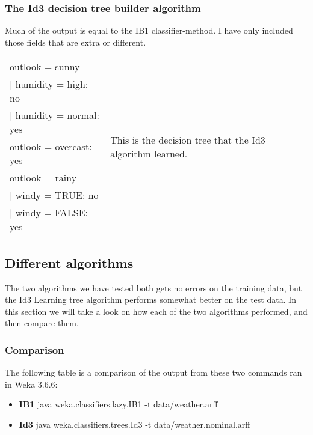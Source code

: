 \documentclass[english,a4paper]{article}
\begin{document}
\subsubsection{The Id3 decision tree builder algorithm}
Much of the output is equal to the IB1 classifier-method. I have only included
those fields that are extra or different.\\
\begin{tabular}{|l|l|}
\hline
outlook = sunny&\multirow{7}{210pt}{
This is the decision tree that the Id3 algorithm learned.
}\\
|  humidity = high: no&\\
|  humidity = normal: yes&\\
outlook = overcast: yes&\\
outlook = rainy&\\
|  windy = TRUE: no&\\
|  windy = FALSE: yes&\\
\hline
\end{tabular}

\subsection{Different algorithms}
The two algorithms we have tested both gets no errors on the training data, but
the Id3 Learning tree algorithm performs somewhat better on the test data. In
this section we will take a look on how each of the two algorithms performed,
and then compare them.

\subsubsection{Comparison}
The following table is a comparison of the output from these two commands ran in
Weka 3.6.6:
\begin{itemize}
  \item{\textbf{IB1}} java weka.classifiers.lazy.IB1 -t data/weather.arff
  \item{\textbf{Id3}} java weka.classifiers.trees.Id3 -t
  data/weather.nominal.arff
  
\end{itemize}
\end{document}
